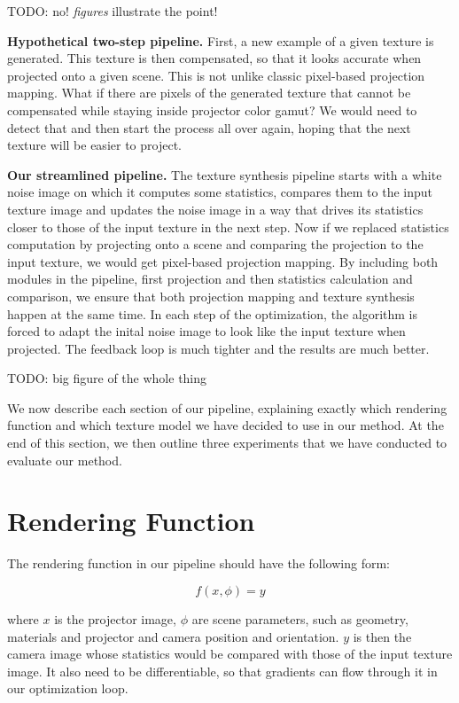 {\color{red} TODO: no! \textit{figures} illustrate the point!}

\textbf{Hypothetical two-step pipeline.} First, a new example of a given texture is generated. This texture is then compensated, so that it looks accurate when projected onto a given scene. This is not unlike classic pixel-based projection mapping. What if there are pixels of the generated texture that cannot be compensated while staying inside projector color gamut? We would need to detect that and then start the process all over again, hoping that the next texture will be easier to project.

\textbf{Our streamlined pipeline.} The texture synthesis pipeline starts with a white noise image on which it computes some statistics, compares them to the input texture image and updates the noise image in a way that drives its statistics closer to those of the input texture in the next step. Now if we replaced statistics computation by projecting onto a scene and comparing the projection to the input texture, we would get pixel-based projection mapping. By including both modules in the pipeline, first projection and then statistics calculation and comparison, we ensure that both projection mapping and texture synthesis happen at the same time. In each step of the optimization, the algorithm is forced to adapt the inital noise image to look like the input texture when projected. The feedback loop is much tighter and the results are much better.

{\color{red} TODO: big figure of the whole thing}

We now describe each section of our pipeline, explaining exactly which rendering function and which texture model we have decided to use in our method. At the end of this section, we then outline three experiments that we have conducted to evaluate our method.

\section{Rendering Function}
\label{section:methods-rendering_function}

The rendering function in our pipeline should have the following form:

\begin{equation}
    \label{eq:rendering_function}
    f(x, \phi) = y  
\end{equation}

where \(x\) is the projector image, \(\phi\) are scene parameters, such as geometry, materials and projector and camera position and orientation. \(y\) is then the camera image whose statistics would be compared with those of the input texture image. It also need to be differentiable, so that gradients can flow through it in our optimization loop.

